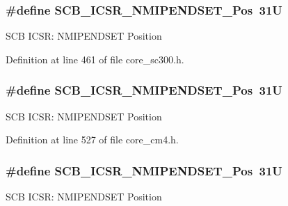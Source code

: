 \subsubsection[{\texorpdfstring{S\+C\+B\+\_\+\+I\+C\+S\+R\+\_\+\+N\+M\+I\+P\+E\+N\+D\+S\+E\+T\+\_\+\+Pos}{SCB_ICSR_NMIPENDSET_Pos}}]{\setlength{\rightskip}{0pt plus 5cm}\#define S\+C\+B\+\_\+\+I\+C\+S\+R\+\_\+\+N\+M\+I\+P\+E\+N\+D\+S\+E\+T\+\_\+\+Pos~31U}\hypertarget{group___c_m_s_i_s___s_c_b_ga750d4b52624a46d71356db4ea769573b}{}\label{group___c_m_s_i_s___s_c_b_ga750d4b52624a46d71356db4ea769573b}
S\+CB I\+C\+SR\+: N\+M\+I\+P\+E\+N\+D\+S\+ET Position 

Definition at line 461 of file core\+\_\+sc300.\+h.

\subsubsection[{\texorpdfstring{S\+C\+B\+\_\+\+I\+C\+S\+R\+\_\+\+N\+M\+I\+P\+E\+N\+D\+S\+E\+T\+\_\+\+Pos}{SCB_ICSR_NMIPENDSET_Pos}}]{\setlength{\rightskip}{0pt plus 5cm}\#define S\+C\+B\+\_\+\+I\+C\+S\+R\+\_\+\+N\+M\+I\+P\+E\+N\+D\+S\+E\+T\+\_\+\+Pos~31U}\hypertarget{group___c_m_s_i_s___s_c_b_ga750d4b52624a46d71356db4ea769573b}{}\label{group___c_m_s_i_s___s_c_b_ga750d4b52624a46d71356db4ea769573b}
S\+CB I\+C\+SR\+: N\+M\+I\+P\+E\+N\+D\+S\+ET Position 

Definition at line 527 of file core\+\_\+cm4.\+h.

\subsubsection[{\texorpdfstring{S\+C\+B\+\_\+\+I\+C\+S\+R\+\_\+\+N\+M\+I\+P\+E\+N\+D\+S\+E\+T\+\_\+\+Pos}{SCB_ICSR_NMIPENDSET_Pos}}]{\setlength{\rightskip}{0pt plus 5cm}\#define S\+C\+B\+\_\+\+I\+C\+S\+R\+\_\+\+N\+M\+I\+P\+E\+N\+D\+S\+E\+T\+\_\+\+Pos~31U}\hypertarget{group___c_m_s_i_s___s_c_b_ga750d4b52624a46d71356db4ea769573b}{}\label{group___c_m_s_i_s___s_c_b_ga750d4b52624a46d71356db4ea769573b}
S\+CB I\+C\+SR\+: N\+M\+I\+P\+E\+N\+D\+S\+ET Position 


